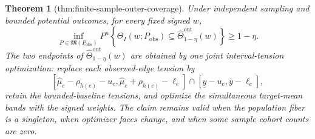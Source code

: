 \documentclass{article}
\newtheorem{theorem}{Theorem}
\begin{document}
\begin{theorem}[thm:finite-sample-outer-coverage]\label{thm:finite-sample-outer-coverage}
Under independent sampling and bounded potential outcomes, for every fixed signed \(w\),
\[
 \inf_{P\in\mathfrak M(P_{\mathrm{obs}})}P^n\left\{
 \Theta_I(w;P_{\mathrm{obs}})
 \subseteq\widehat\Theta^{\mathrm{out}}_{1-\eta}(w)
 \right\}\ge 1-\eta.
\]
The two endpoints of \(\widehat\Theta^{\mathrm{out}}_{1-\eta}(w)\) are obtained by one joint interval-tension optimization: replace each observed-edge tension by
\[
 [\widehat\mu_e-\rho_{h(e)}-u_e,\widehat\mu_e+\rho_{h(e)}-\ell_e]
 \cap[\underline y-u_e,\overline y-\ell_e],
\]
retain the bounded-baseline tensions, and optimize the simultaneous target-mean bands with the signed weights. The claim remains valid when the population fiber is a singleton, when optimizer faces change, and when some sample cohort counts are zero.
\end{theorem}
\end{document}

